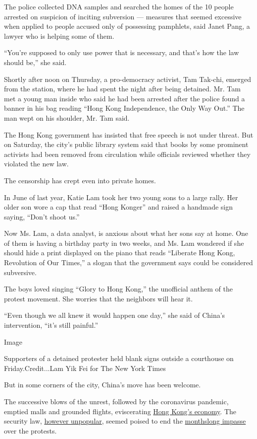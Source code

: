 The police collected DNA samples and searched the homes of the 10 people
arrested on suspicion of inciting subversion --- measures that seemed
excessive when applied to people accused only of possessing pamphlets,
said Janet Pang, a lawyer who is helping some of them.

``You're supposed to only use power that is necessary, and that's how
the law should be,'' she said.

Shortly after noon on Thursday, a pro-democracy activist, Tam Tak-chi,
emerged from the station, where he had spent the night after being
detained. Mr. Tam met a young man inside who said he had been arrested
after the police found a banner in his bag reading ``Hong Kong
Independence, the Only Way Out.'' The man wept on his shoulder, Mr. Tam
said.

The Hong Kong government has insisted that free speech is not under
threat. But on Saturday, the city's public library system said that
books by some prominent activists had been removed from circulation
while officials reviewed whether they violated the new law.

The censorship has crept even into private homes.

In June of last year, Katie Lam took her two young sons to a large
rally. Her older son wore a cap that read ``Hong Konger'' and raised a
handmade sign saying, ``Don't shoot us.''

Now Ms. Lam, a data analyst, is anxious about what her sons say at home.
One of them is having a birthday party in two weeks, and Ms. Lam
wondered if she should hide a print displayed on the piano that reads
``Liberate Hong Kong, Revolution of Our Times,'' a slogan that the
government says could be considered subversive.

The boys loved singing ``Glory to Hong Kong,'' the unofficial anthem of
the protest movement. She worries that the neighbors will hear it.

``Even though we all knew it would happen one day,'' she said of China's
intervention, ``it's still painful.''

Image

Supporters of a detained protester held blank signs outside a courthouse
on Friday.Credit...Lam Yik Fei for The New York Times

But in some corners of the city, China's move has been welcome.

The successive blows of the unrest, followed by the coronavirus
pandemic, emptied malls and grounded flights, eviscerating
\href{https://www.nytimes3xbfgragh.onion/2019/11/14/business/hong-kong-protests-recession.html}{Hong
Kong's economy}. The security law,
\href{https://www.reuters.com/article/us-hongkong-protests-poll-exclusive/exclusive-support-dips-for-hong-kong-democracy-protests-as-national-security-law-looms-poll-idUSKBN23W3KO}{however
unpopular}, seemed poised to end the
\href{https://www.nytimes3xbfgragh.onion/2019/10/17/world/asia/hong-kong-protests.html}{monthslong
impasse} over the protests.


